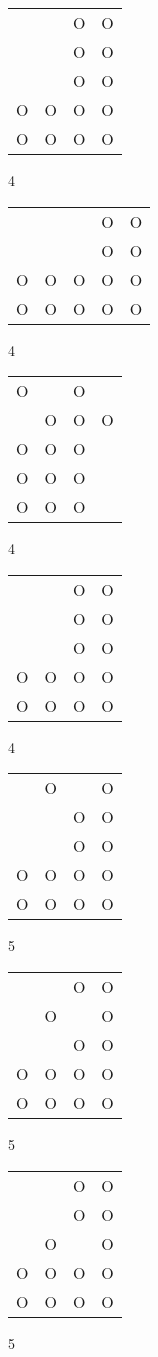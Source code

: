 \begin{tabular}{|m{0.2cm}m{0.2cm}m{0.2cm}m{0.2cm}|}\hline
 & &O&O\\
 & &O&O\\
 & &O&O\\
O&O&O&O\\
O&O&O&O\\
\hline\end{tabular}4
\begin{tabular}{|m{0.2cm}m{0.2cm}m{0.2cm}m{0.2cm}m{0.2cm}|}\hline
 & & &O&O\\
 & & &O&O\\
O&O&O&O&O\\
O&O&O&O&O\\
\hline\end{tabular}4
\begin{tabular}{|m{0.2cm}m{0.2cm}m{0.2cm}m{0.2cm}|}\hline
O& &O& \\
 &O&O&O\\
O&O&O& \\
O&O&O& \\
O&O&O& \\
\hline\end{tabular}4
\begin{tabular}{|m{0.2cm}m{0.2cm}m{0.2cm}m{0.2cm}|}\hline
 & &O&O\\
 & &O&O\\
 & &O&O\\
O&O&O&O\\
O&O&O&O\\
\hline\end{tabular}4
\begin{tabular}{|m{0.2cm}m{0.2cm}m{0.2cm}m{0.2cm}|}\hline
 &O& &O\\
 & &O&O\\
 & &O&O\\
O&O&O&O\\
O&O&O&O\\
\hline\end{tabular}5
\begin{tabular}{|m{0.2cm}m{0.2cm}m{0.2cm}m{0.2cm}|}\hline
 & &O&O\\
 &O& &O\\
 & &O&O\\
O&O&O&O\\
O&O&O&O\\
\hline\end{tabular}5
\begin{tabular}{|m{0.2cm}m{0.2cm}m{0.2cm}m{0.2cm}|}\hline
 & &O&O\\
 & &O&O\\
 &O& &O\\
O&O&O&O\\
O&O&O&O\\
\hline\end{tabular}5
